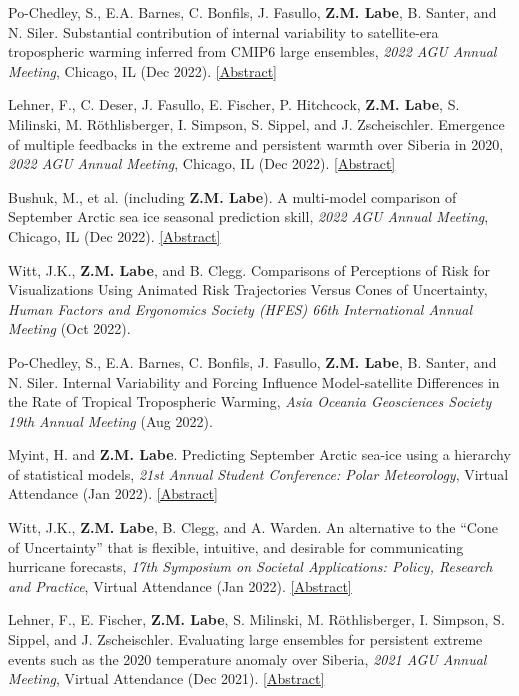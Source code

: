\documentclass[margin,line,palatino,courier,10pt]{res}
\begin{document}
\begin{resume}
\begin{etaremune}[leftmargin=0in,topsep=0in,parsep=0in]
\item Po-Chedley, S., E.A. Barnes, C. Bonfils, J. Fasullo, \textbf{Z.M. Labe}, B. Santer, and N. Siler. Substantial contribution of internal variability to satellite-era tropospheric warming inferred from CMIP6 large ensembles, \textit{2022 AGU Annual Meeting}, Chicago, IL (Dec 2022). \href{https://agu.confex.com/agu/fm22/meetingapp.cgi/Paper/1095614}{[Abstract]}
\item Lehner, F., C. Deser, J. Fasullo, E. Fischer, P. Hitchcock, \textbf{Z.M. Labe}, S. Milinski, M. Röthlisberger, I. Simpson, S. Sippel, and J. Zscheischler. Emergence of multiple feedbacks in the extreme and persistent warmth over Siberia in 2020, \textit{2022 AGU Annual Meeting}, Chicago, IL (Dec 2022). \href{https://agu.confex.com/agu/fm22/meetingapp.cgi/Paper/1190729}{[Abstract]}
\item Bushuk, M., et al. (including \textbf{Z.M. Labe}). A multi-model comparison of September Arctic sea ice seasonal prediction skill, \textit{2022 AGU Annual Meeting}, Chicago, IL (Dec 2022). \href{https://agu.confex.com/agu/fm22/meetingapp.cgi/Paper/1179488}{[Abstract]}
\item Witt, J.K., \textbf{Z.M. Labe}, and B. Clegg. Comparisons of Perceptions of Risk for Visualizations Using Animated Risk Trajectories Versus Cones of Uncertainty, \textit{Human Factors and Ergonomics Society (HFES) 66th International Annual Meeting} (Oct 2022).
\item Po-Chedley, S., E.A. Barnes, C. Bonfils, J. Fasullo, \textbf{Z.M. Labe}, B. Santer, and N. Siler. Internal Variability and Forcing Influence Model-satellite Differences in the Rate of Tropical Tropospheric Warming, \textit{Asia Oceania Geosciences Society 19th Annual Meeting} (Aug 2022).
\item Myint, H. and \textbf{Z.M. Labe}. Predicting September Arctic sea-ice using a hierarchy of statistical models, \textit{21st Annual Student Conference: Polar Meteorology}, Virtual Attendance (Jan 2022). \href{https://ams.confex.com/ams/102ANNUAL/meetingapp.cgi/Paper/391367}{[Abstract]}
\item Witt, J.K., \textbf{Z.M. Labe}, B. Clegg, and A. Warden. An alternative to the ``Cone of Uncertainty'' that is flexible, intuitive, and desirable for communicating hurricane forecasts, \textit{17th Symposium on Societal Applications: Policy, Research and Practice}, Virtual Attendance (Jan 2022). \href{https://ams.confex.com/ams/102ANNUAL/meetingapp.cgi/Paper/395666}{[Abstract]}
\item Lehner, F., E. Fischer, \textbf{Z.M. Labe}, S. Milinski, M. R\"{o}thlisberger, I. Simpson, S. Sippel, and J. Zscheischler. Evaluating large ensembles for persistent extreme events such as the 2020 temperature anomaly over Siberia, \textit{2021 AGU Annual Meeting}, Virtual Attendance (Dec 2021). \href{https://agu.confex.com/agu/fm21/meetingapp.cgi/Paper/944312}{[Abstract]}

\end{etaremune}
\end{resume}
\end{document}
